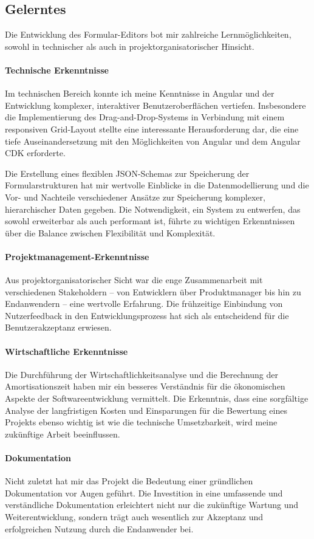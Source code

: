 \documentclass[a4paper,11pt]{article}
\begin{document}
\subsection{Gelerntes}
Die Entwicklung des Formular-Editors bot mir zahlreiche Lernmöglichkeiten, sowohl in technischer als auch in projektorganisatorischer Hinsicht.

\paragraph{Technische Erkenntnisse}
Im technischen Bereich konnte ich meine Kenntnisse in Angular und der Entwicklung komplexer, interaktiver Benutzeroberflächen vertiefen. Insbesondere die Implementierung des Drag-and-Drop-Systems in Verbindung mit einem responsiven Grid-Layout stellte eine interessante Herausforderung dar, die eine tiefe Auseinandersetzung mit den Möglichkeiten von Angular und dem Angular CDK erforderte.

Die Erstellung eines flexiblen JSON-Schemas zur Speicherung der Formularstrukturen hat mir wertvolle Einblicke in die Datenmodellierung und die Vor- und Nachteile verschiedener Ansätze zur Speicherung komplexer, hierarchischer Daten gegeben. Die Notwendigkeit, ein System zu entwerfen, das sowohl erweiterbar als auch performant ist, führte zu wichtigen Erkenntnissen über die Balance zwischen Flexibilität und Komplexität.

\paragraph{Projektmanagement-Erkenntnisse}
Aus projektorganisatorischer Sicht war die enge Zusammenarbeit mit verschiedenen Stakeholdern – von Entwicklern über Produktmanager bis hin zu Endanwendern – eine wertvolle Erfahrung. Die frühzeitige Einbindung von Nutzerfeedback in den Entwicklungsprozess hat sich als entscheidend für die Benutzerakzeptanz erwiesen.

\paragraph{Wirtschaftliche Erkenntnisse}
Die Durchführung der Wirtschaftlichkeitsanalyse und die Berechnung der Amortisationszeit haben mir ein besseres Verständnis für die ökonomischen Aspekte der Softwareentwicklung vermittelt. Die Erkenntnis, dass eine sorgfältige Analyse der langfristigen Kosten und Einsparungen für die Bewertung eines Projekts ebenso wichtig ist wie die technische Umsetzbarkeit, wird meine zukünftige Arbeit beeinflussen.

\paragraph{Dokumentation}
Nicht zuletzt hat mir das Projekt die Bedeutung einer gründlichen Dokumentation vor Augen geführt. Die Investition in eine umfassende und verständliche Dokumentation erleichtert nicht nur die zukünftige Wartung und Weiterentwicklung, sondern trägt auch wesentlich zur Akzeptanz und erfolgreichen Nutzung durch die Endanwender bei.
\end{document}
